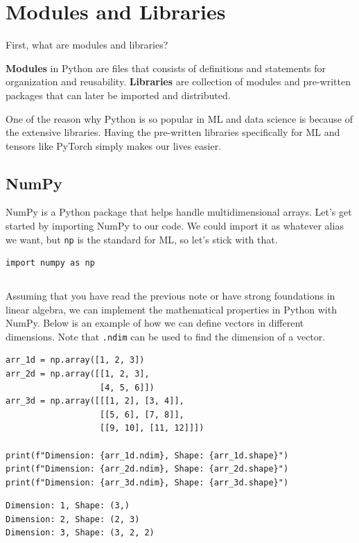 \documentclass[../../main.tex]{subfiles}
\begin{document}
\section{Modules and Libraries}

First, what are modules and libraries?

\begin{definition}{}{}
\textbf{Modules} in Python are files that consists of definitions
and statements for organization and reusability. \textbf{Libraries}
are collection of modules and pre-written packages that can later
be imported and distributed.
\end{definition}

One of the reason why Python is so popular in ML and data science
is because of the extensive libraries. Having the pre-written
libraries specifically for ML and tensors like PyTorch simply
makes our lives easier.

\subsection{NumPy}

NumPy is a Python package that helps handle multidimensional arrays.
Let's get started by importing NumPy to our code. We could import
it as whatever alias we want, but \verb|np| is the standard for ML,
so let's stick with that.

\begin{jupyter}
\begin{lstlisting}[style=jin]
import numpy as np
\end{lstlisting}
\begin{lstlisting}[style=jout]
\end{lstlisting}
\end{jupyter}

Assuming that you have read the previous note or have strong
foundations in linear algebra, we can implement the mathematical
properties in Python with NumPy. Below is an example of how we can
define vectors in different dimensions. Note that \verb|.ndim| can
be used to find the dimension of a vector.

\begin{jupyter}
\begin{lstlisting}[style=jin]
arr_1d = np.array([1, 2, 3])
arr_2d = np.array([[1, 2, 3],
                   [4, 5, 6]])
arr_3d = np.array([[[1, 2], [3, 4]],
                   [[5, 6], [7, 8]],
                   [[9, 10], [11, 12]]])

print(f"Dimension: {arr_1d.ndim}, Shape: {arr_1d.shape}")
print(f"Dimension: {arr_2d.ndim}, Shape: {arr_2d.shape}")
print(f"Dimension: {arr_3d.ndim}, Shape: {arr_3d.shape}")
\end{lstlisting}

\begin{lstlisting}[style=jout]
Dimension: 1, Shape: (3,)
Dimension: 2, Shape: (2, 3)
Dimension: 3, Shape: (3, 2, 2)
\end{lstlisting}
\end{jupyter}
\end{document}
